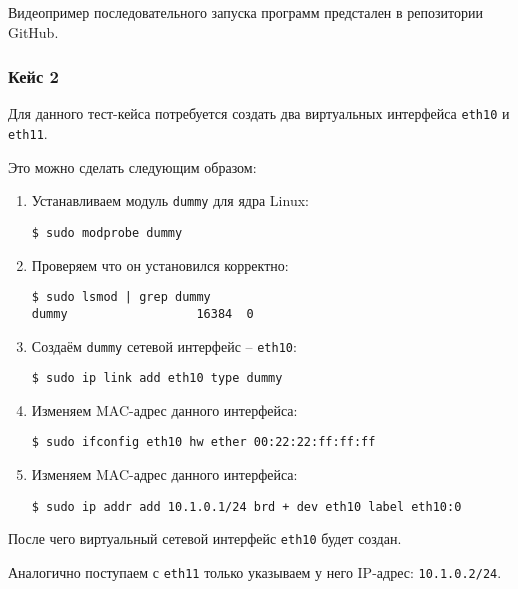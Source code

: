 \linespace

Видеопример последовательного запуска программ предстален в репозитории GitHub.

\subsubsection{Кейс 2}

Для данного тест-кейса потребуется создать два виртуальных интерфейса \verb|eth10| и \verb|eth11|.

Это можно сделать следующим образом:
\begin{enumerate}

\item Устанавливаем модуль \verb|dummy| для ядра Linux:
\begin{lstlisting}
$ sudo modprobe dummy
\end{lstlisting}

\item Проверяем что он установился корректно:
\begin{lstlisting}
$ sudo lsmod | grep dummy
dummy                  16384  0 
\end{lstlisting}

\item Создаём \verb|dummy| сетевой интерфейс -- \verb|eth10|:
\begin{lstlisting}
$ sudo ip link add eth10 type dummy
\end{lstlisting}

\item Изменяем MAC-адрес данного интерфейса:
\begin{lstlisting}
$ sudo ifconfig eth10 hw ether 00:22:22:ff:ff:ff
\end{lstlisting}

\newpage

\item Изменяем MAC-адрес данного интерфейса:
\begin{lstlisting}
$ sudo ip addr add 10.1.0.1/24 brd + dev eth10 label eth10:0
\end{lstlisting}
\end{enumerate}

\linespace

После чего виртуальный сетевой интерфейс \verb|eth10| будет создан.

\linespace

Аналогично поступаем с \verb|eth11| только указываем у него IP-адрес: \verb|10.1.0.2/24|.

\linespace

